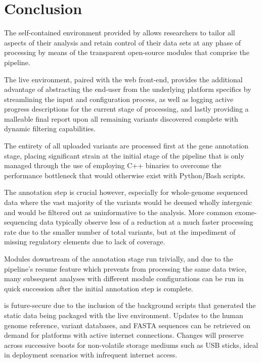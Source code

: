 
\section{Conclusion}

The self-contained environment provided by \app allows researchers to tailor all aspects of their analysis and retain control of their data sets at any phase of processing by means of the transparent open-source modules that comprise the pipeline. 

The live environment, paired with the web front-end, provides the additional advantage of abstracting the end-user from the underlying platform specifics by streamlining the input and configuration process, as well as logging active progress descriptions for the current stage of processing, and lastly providing a malleable final report upon all remaining variants discovered complete with dynamic filtering capabilities.

The entirety of all uploaded variants are processed first at the gene annotation stage, placing significant strain at the initial stage of the pipeline that is only managed through the use of employing C++ binaries to overcome the performance bottleneck that would otherwise exist with Python/Bash scripts.

The annotation step is crucial however, especially for whole-genome sequenced data where the vast majority of the variants would be deemed wholly intergenic and would be filtered out as uninformative to the analysis. More common exome-sequencing data typically observe less of a reduction at a much faster processing rate due to the smaller number of total variants, but at the impediment of missing regulatory elements due to lack of coverage.

Modules downstream of the annotation stage run trivially, and due to the pipeline's resume feature which prevents \app from processing the same data twice, many subsequent analyses with different module configurations can be run in quick succession after the initial annotation step is complete.

\app is future-secure due to the inclusion of the background scripts that generated the static data being packaged with the live environment. Updates to the human genome reference, variant databases, and FASTA sequences can be retrieved on demand for platforms with active internet connections. Changes will preserve across successive boots for non-volatile storage mediums such as USB sticks, ideal in deployment scenarios with infrequent internet access.

